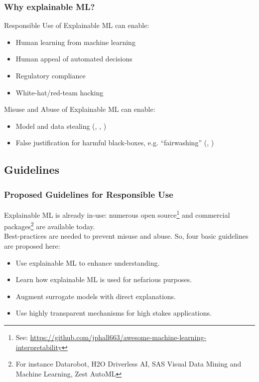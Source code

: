\documentclass[11pt,
               aspectratio=169,
               hyperref={colorlinks}
               ]{beamer}
\begin{document}

	\begin{frame}
	
		\frametitle{Why explainable ML?}
		\vspace{10pt}
		Responsible Use of Explainable ML can enable:
		\begin{itemize}\footnotesize
			\item Human learning from machine learning
			\item Human appeal of automated decisions
			\item Regulatory compliance
			\item White-hat/red-team hacking
		\end{itemize}
		\vspace{5pt}
		Misuse and Abuse of Explainable ML can enable:
		\begin{itemize}\footnotesize
			\item Model and data stealing (\citet{model_stealing}, \citet{membership_inference}, \citet{shokri2019privacy})
			\item False justification for harmful black-boxes, e.g. ``fairwashing'' (\citet{fair_washing}, \citet{please_stop})
		\end{itemize}
		\normalsize
		
	\end{frame}
	
	
	\subsection{Guidelines}

	\begin{frame}
	
		\frametitle{Proposed Guidelines for Responsible Use}
		
		Explainable ML is already in-use: numerous open source\footnote{\tiny{See: \url{https://github.com/jphall663/awesome-machine-learning-interpretability}}} and commercial packages\footnote{\tiny{For instance  Datarobot, H2O Driverless AI, SAS Visual Data Mining and Machine Learning, Zest AutoML}} are available today.\\
		\vspace{5pt}
		Best-practices are needed to prevent misuse and abuse. So, four basic guidelines are proposed here:
		\vspace{5pt}
		\begin{itemize}
			\item Use explainable ML to enhance understanding.
			\item Learn how explainable ML is used for nefarious purposes.
			\item Augment surrogate models with direct explanations.
			\item Use highly transparent mechanisms for high stakes applications.
		\end{itemize}
		
	\end{frame}
\end{document}
